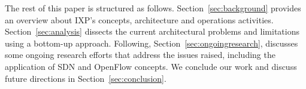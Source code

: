 \documentclass[12pt]{article}
\begin{document}
The rest of this paper is structured as follows. Section~\ref{sec:background} provides an overview about IXP's concepts, architecture and operations activities. Section~\ref{sec:analysis} dissects the current architectural problems and limitations using a bottom-up approach. Following, Section~\ref{sec:ongoingresearch}, discusses some ongoing research efforts that address the issues raised, including the application of SDN and OpenFlow concepts. We conclude our work and discuss future directions in Section~\ref{sec:conclusion}.



\end{document}
